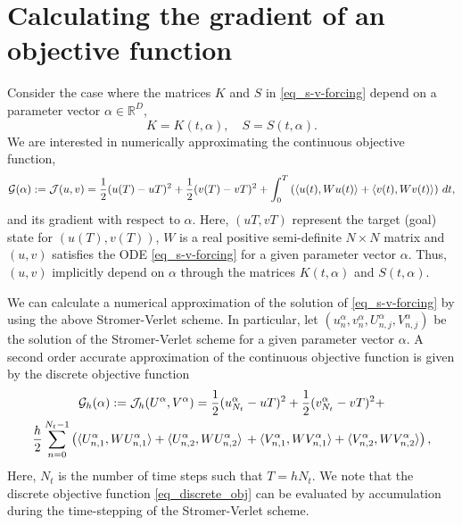 \documentclass[11pt]{article}
\begin{document}
\section{Calculating the gradient of an objective function}

Consider the case where the matrices $K$ and $S$ in \eqref{eq_s-v-forcing} depend on a parameter
vector $\alpha \in {\mathbb R}^D$,
\[
K = K(t,\alpha),\quad S = S(t,\alpha).
\]
We are interested in numerically approximating the continuous objective function,
\[
{\cal G}(\alpha) := {\cal J}(u, v) =\frac{1}{2}(u(T)-uT)^2 + \frac{1}{2}(v(T)-vT)^2 + \int_{0}^T \left( \langle u(t),W u(t) \rangle +  \langle v(t),W v(t) \rangle\right)\, dt,
\]
and its gradient with respect to $\alpha$. Here, $(uT, vT)$ represent the target (goal) state for $(u(T),v(T))$,
$W$ is a real positive semi-definite $N\times N$ matrix and $(u,v)$ satisfies the ODE \eqref{eq_s-v-forcing} for a
given parameter vector $\alpha$. Thus, $(u,v)$ implicitly depend on $\alpha$ through the matrices
$K(t,\alpha)$ and $S(t,\alpha)$.

We can calculate a numerical approximation of the solution of \eqref{eq_s-v-forcing} by
using the above Stromer-Verlet scheme. In particular, let $(u^\alpha_n, v^\alpha_n, U^\alpha_{n,j}, V^\alpha_{n,j})$ be the solution of
the Stromer-Verlet scheme for a given parameter vector $\alpha$. A second order accurate approximation of the continuous
objective function is given by the discrete objective function
\begin{multline}\label{eq_discrete_obj}
  {\cal G}_h(\alpha) :=  {\cal J}_h(U^\alpha, V^\alpha) 
  = \frac{1}{2}(u^\alpha_{N_t} - uT)^2 + \frac{1}{2}(v^\alpha_{N_t} - vT)^2 +  \\
  \frac{h}{2} \sum_{n=0}^{N_t-1}
  \left( \langle U^\alpha_{n,1}, W U^\alpha_{n,1}\rangle +  \langle U^\alpha_{n,2}, W U^\alpha_{n,2}\rangle\, + 
  \langle V^\alpha_{n,1}, W V^\alpha_{n,1}\rangle + \langle V^\alpha_{n,2}, W V^\alpha_{n,2}\rangle
%
\right),
\end{multline}
Here, $N_t$ is the number of time steps such that
$T=h N_t$.  We note that the discrete objective function \eqref{eq_discrete_obj} can be evaluated by
accumulation during the time-stepping of the Stromer-Verlet scheme.
\end{document}
